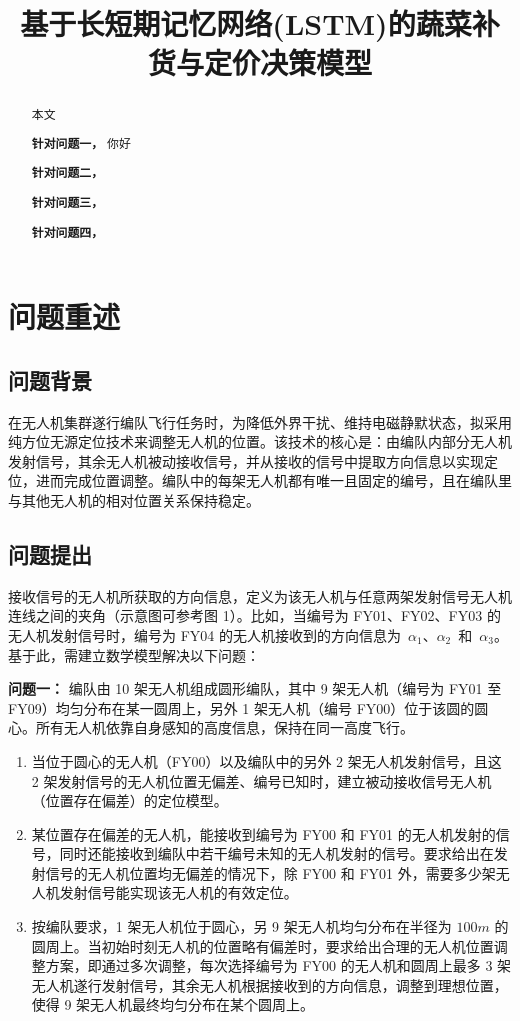 \documentclass[withoutpreface,bwprint]{cumcmthesis} %
\title{基于长短期记忆网络(LSTM)的蔬菜补货与定价决策模型}
\begin{document}
\maketitle
\nocite{*}


\begin{abstract}
本文

    \textbf{针对问题一，}
你好

    \textbf{针对问题二，}

    \textbf{针对问题三，}

    \textbf{针对问题四，}

\end{abstract}

\section{问题重述}

\subsection{问题背景}
在无人机集群遂行编队飞行任务时，为降低外界干扰、维持电磁静默状态，拟采用纯方位无源定位技术来调整无人机的位置。该技术的核心是：由编队内部分无人机发射信号，其余无人机被动接收信号，并从接收的信号中提取方向信息以实现定位，进而完成位置调整。编队中的每架无人机都有唯一且固定的编号，且在编队里与其他无人机的相对位置关系保持稳定。

\subsection{问题提出}
接收信号的无人机所获取的方向信息，定义为该无人机与任意两架发射信号无人机连线之间的夹角（示意图可参考图 1）。比如，当编号为 FY01、FY02、FY03 的无人机发射信号时，编号为 FY04 的无人机接收到的方向信息为 \(\alpha_1\)、\(\alpha_2\) 和 \(\alpha_3\)。基于此，需建立数学模型解决以下问题：

\textbf{问题一：}
编队由 10 架无人机组成圆形编队，其中 9 架无人机（编号为 FY01 至 FY09）均匀分布在某一圆周上，另外 1 架无人机（编号 FY00）位于该圆的圆心。所有无人机依靠自身感知的高度信息，保持在同一高度飞行。

\begin{enumerate}
    \item 当位于圆心的无人机（FY00）以及编队中的另外 2 架无人机发射信号，且这 2 架发射信号的无人机位置无偏差、编号已知时，建立被动接收信号无人机（位置存在偏差）的定位模型。
    \item 某位置存在偏差的无人机，能接收到编号为 FY00 和 FY01 的无人机发射的信号，同时还能接收到编队中若干编号未知的无人机发射的信号。要求给出在发射信号的无人机位置均无偏差的情况下，除 FY00 和 FY01 外，需要多少架无人机发射信号能实现该无人机的有效定位。
    \item 按编队要求，1 架无人机位于圆心，另 9 架无人机均匀分布在半径为 $100m$ 的圆周上。当初始时刻无人机的位置略有偏差时，要求给出合理的无人机位置调整方案，即通过多次调整，每次选择编号为 FY00 的无人机和圆周上最多 3 架无人机遂行发射信号，其余无人机根据接收到的方向信息，调整到理想位置，使得 9 架无人机最终均匀分布在某个圆周上。
\end{enumerate}
\end{document}
